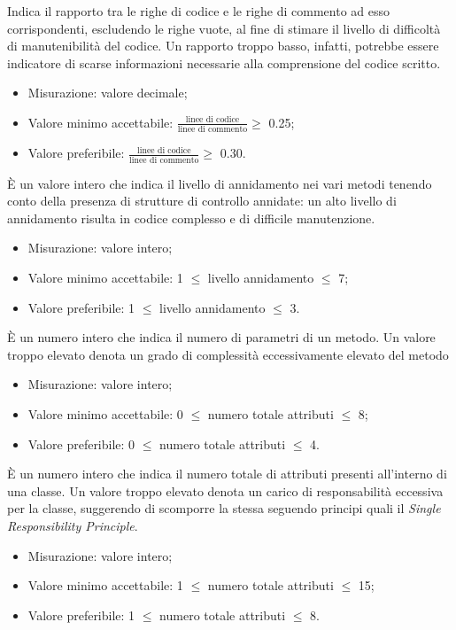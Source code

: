 			Indica il rapporto tra le righe di codice e le righe di commento ad esso corrispondenti, escludendo le righe vuote, al fine di stimare il livello di difficoltà di manutenibilità del codice. Un rapporto troppo basso, infatti, potrebbe essere indicatore di scarse informazioni necessarie alla comprensione del codice scritto.
		\begin{itemize}
			\item{Misurazione: valore decimale;}
			\item{Valore minimo accettabile: $\displaystyle\frac{\mbox{linee di codice}}{\mbox{linee di commento}} \geq$ 0.25;}
			\item{Valore preferibile: $\displaystyle\frac{\mbox{linee di codice}}{\mbox{linee di commento}} \geq$ 0.30.}
		\end{itemize}

			È un valore intero che indica il livello di annidamento nei vari metodi tenendo conto della presenza di strutture di controllo annidate: un alto livello di annidamento risulta in codice complesso e di difficile manutenzione.
		\begin{itemize}
			\item{Misurazione: valore intero;}
			\item{Valore minimo accettabile: 1 $\leq$ livello annidamento $\leq$ 7;}
			\item{Valore preferibile: 1 $\leq$ livello annidamento $\leq$ 3.}
		\end{itemize}
			
			È un numero intero che indica il numero di parametri di un metodo. Un valore troppo elevato denota un grado di complessità eccessivamente elevato del metodo
		\begin{itemize}
			\item{Misurazione: valore intero;}
			\item{Valore minimo accettabile: 0 $\leq$ numero totale attributi $\leq$ 8;}
			\item{Valore preferibile: 0 $\leq$ numero totale attributi $\leq$ 4.}
		\end{itemize}
			
			È un numero intero che indica il numero totale di attributi presenti all'interno di una classe. Un valore troppo elevato denota un carico di responsabilità eccessiva per la classe, suggerendo di scomporre la stessa seguendo principi quali il \textit{Single Responsibility Principle}.
		\begin{itemize}
			\item{Misurazione: valore intero;}
			\item{Valore minimo accettabile: 1 $\leq$ numero totale attributi $\leq$ 15;}
			\item{Valore preferibile: 1 $\leq$ numero totale attributi $\leq$ 8.}
		\end{itemize}

